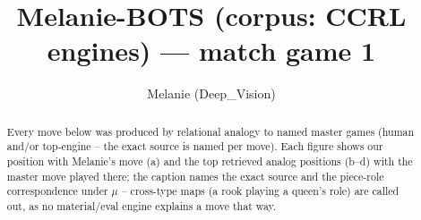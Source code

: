 \documentclass[11pt]{article}
\title{Melanie-BOTS (corpus: CCRL engines) — match game 1}
\author{Melanie (Deep\_Vision)}
\date{}
\begin{document}
\maketitle

\begin{abstract}Every move below was produced by relational analogy to named master games (human and/or top-engine -- the exact source is named per move). Each figure shows our position with Melanie's move (a) and the top retrieved analog positions (b--d) with the master move played there; the caption names the exact source and the piece-role correspondence under $\mu$ -- cross-type maps (a rook playing a queen's role) are called out, as no material/eval engine explains a move that way.\end{abstract}

\begin{figure}[p]\centering
\begin{subfigure}{0.46\textwidth}\centering
\resizebox{\linewidth}{!}{%
\newchessgame
\chessboard[
  setfen={r1bq1rk1/pppp1ppp/3n1b2/8/3P4/8/PPP2PPP/RNBQRBK1 b - - 2 10},
  showmover=false,
  pgfstyle=straightmove, color=movearrow, markmove={f8-e8}
]}
\caption{}
\end{subfigure}\hfill
\begin{subfigure}{0.46\textwidth}\centering
\resizebox{\linewidth}{!}{%
\newchessgame
\chessboard[
  setfen={r1bq1rk1/pppp1ppp/3n1b2/8/3P4/8/PPP2PPP/RNBQRBK1 b - - 2 10},
  showmover=false,
  pgfstyle=straightmove, color=movearrow, markmove={f8-e8}
]}
\caption{}
\end{subfigure}
\\[4pt]
\begin{subfigure}{0.46\textwidth}\centering
\resizebox{\linewidth}{!}{%
\newchessgame
\chessboard[
  setfen={r1bq1rk1/pppp1ppp/3n1b2/8/3P4/8/PPP2PPP/RNBQRBK1 b - - 2 10},
  showmover=false,
  pgfstyle=straightmove, color=movearrow, markmove={f8-e8}
]}
\caption{}
\end{subfigure}\hfill
\begin{subfigure}{0.46\textwidth}\centering
\resizebox{\linewidth}{!}{%
\newchessgame
\chessboard[
  setfen={r1bq1rk1/pppp1ppp/3n1b2/8/3P4/8/PPP2PPP/RNBQRBK1 b - - 2 10},
  showmover=false,
  pgfstyle=straightmove, color=movearrow, markmove={f8-e8}
]}
\caption{}
\end{subfigure}

\end{figure}
\end{document}
